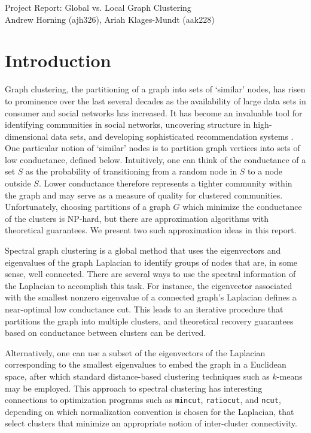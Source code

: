 \documentclass[11pt]{article}
\newcommand{\yoursubtitle}{Project Report: Global vs. Local Graph Clustering}
\begin{document}
\newcommand{\Half}{\frac{1}{2}}



\begin{center}\LARGE \yoursubtitle\\
\large Andrew Horning (ajh326), Ariah Klages-Mundt (aak228)
\end{center}

\section{Introduction}

Graph clustering, the partitioning of a graph into sets of `similar' nodes, has risen to prominence over the last several decades as the availability of large data sets in consumer and social networks has increased. It has become an invaluable tool for identifying communities in social networks, uncovering structure in high-dimensional data sets, and developing sophisticated recommendation systems \cite{social_network, high_dim_data, recommenders}. One particular notion of `similar' nodes is to partition graph vertices into sets of low conductance, defined below. Intuitively, one can think of the conductance of a set $S$ as the probability of transitioning from a random node in $S$ to a node outside $S$. Lower conductance therefore represents a tighter community within the graph and may serve as a measure of quality for clustered communities. Unfortunately, choosing partitions of a graph $G$ which minimize the conductance of the clusters is NP-hard, but there are approximation algorithms with theoretical guarantees. We present two such approximation ideas in this report.

Spectral graph clustering is a global method that uses the eigenvectors and eigenvalues of the graph Laplacian to identify groups of nodes that are, in some sense, well connected. There are several ways to use the spectral information of the Laplacian to accomplish this task. For instance, the eigenvector associated with the smallest nonzero eigenvalue of a connected graph's Laplacian defines a near-optimal low conductance cut. This leads to an iterative procedure that partitions the graph into multiple clusters, and theoretical recovery guarantees based on conductance between clusters can be derived. 

Alternatively, one can use a subset of the eigenvectors of the Laplacian corresponding to the smallest eigenvalues to embed the graph in a Euclidean space, after which standard distance-based clustering techniques such as $k$-means may be employed. This approach to spectral clustering has interesting connections to optimization programs such as \texttt{mincut}, \texttt{ratiocut}, and \texttt{ncut}, depending on which normalization convention is chosen for the Laplacian, that select clusters that minimize an appropriate notion of inter-cluster connectivity.
\end{document}
